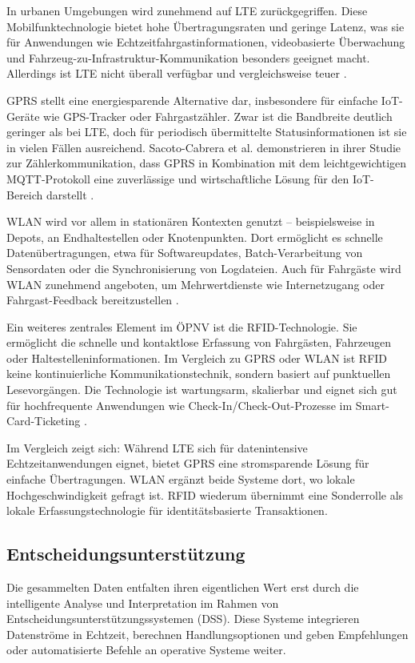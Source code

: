 In urbanen Umgebungen wird zunehmend auf LTE zurückgegriffen. Diese Mobilfunktechnologie bietet hohe Übertragungsraten und geringe Latenz, was sie für Anwendungen wie Echtzeitfahrgastinformationen, videobasierte Überwachung und Fahrzeug-zu-Infrastruktur-Kommunikation besonders geeignet macht. Allerdings ist LTE nicht überall verfügbar und vergleichsweise teuer \cite{Gubbi2013}.

GPRS stellt eine energiesparende Alternative dar, insbesondere für einfache IoT-Geräte wie GPS-Tracker oder Fahrgastzähler. Zwar ist die Bandbreite deutlich geringer als bei LTE, doch für periodisch übermittelte Statusinformationen ist sie in vielen Fällen ausreichend. Sacoto-Cabrera et al. demonstrieren in ihrer Studie zur Zählerkommunikation, dass GPRS in Kombination mit dem leichtgewichtigen MQTT-Protokoll eine zuverlässige und wirtschaftliche Lösung für den IoT-Bereich darstellt \cite{SacotoCabrera2017}.

WLAN wird vor allem in stationären Kontexten genutzt – beispielsweise in Depots, an Endhaltestellen oder Knotenpunkten. Dort ermöglicht es schnelle Datenübertragungen, etwa für Softwareupdates, Batch-Verarbeitung von Sensordaten oder die Synchronisierung von Logdateien. Auch für Fahrgäste wird WLAN zunehmend angeboten, um Mehrwertdienste wie Internetzugang oder Fahrgast-Feedback bereitzustellen \cite{Fu2012}.

Ein weiteres zentrales Element im ÖPNV ist die RFID-Technologie. Sie ermöglicht die schnelle und kontaktlose Erfassung von Fahrgästen, Fahrzeugen oder Haltestelleninformationen. Im Vergleich zu GPRS oder WLAN ist RFID keine kontinuierliche Kommunikationstechnik, sondern basiert auf punktuellen Lesevorgängen. Die Technologie ist wartungsarm, skalierbar und eignet sich gut für hochfrequente Anwendungen wie Check-In/Check-Out-Prozesse im Smart-Card-Ticketing \cite{Amoroso2011}.

Im Vergleich zeigt sich: Während LTE sich für datenintensive Echtzeitanwendungen eignet, bietet GPRS eine stromsparende Lösung für einfache Übertragungen. WLAN ergänzt beide Systeme dort, wo lokale Hochgeschwindigkeit gefragt ist. RFID wiederum übernimmt eine Sonderrolle als lokale Erfassungstechnologie für identitätsbasierte Transaktionen.

\subsection{Entscheidungsunterstützung}

Die gesammelten Daten entfalten ihren eigentlichen Wert erst durch die intelligente Analyse und Interpretation im Rahmen von Entscheidungsunterstützungssystemen (DSS). Diese Systeme integrieren Datenströme in Echtzeit, berechnen Handlungsoptionen und geben Empfehlungen oder automatisierte Befehle an operative Systeme weiter.

